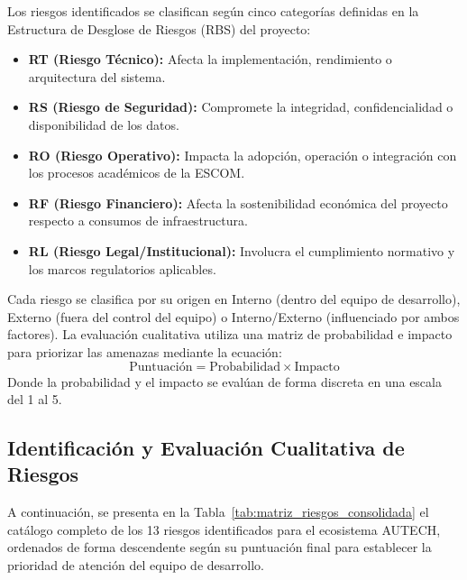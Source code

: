 Los riesgos identificados se clasifican según cinco categorías definidas en la Estructura de Desglose de Riesgos (RBS) del proyecto:
\begin{itemize}
    \item \textbf{RT (Riesgo Técnico):} Afecta la implementación, rendimiento o arquitectura del sistema.
    \item \textbf{RS (Riesgo de Seguridad):} Compromete la integridad, confidencialidad o disponibilidad de los datos.
    \item \textbf{RO (Riesgo Operativo):} Impacta la adopción, operación o integración con los procesos académicos de la ESCOM.
    \item \textbf{RF (Riesgo Financiero):} Afecta la sostenibilidad económica del proyecto respecto a consumos de infraestructura.
    \item \textbf{RL (Riesgo Legal/Institucional):} Involucra el cumplimiento normativo y los marcos regulatorios aplicables.
\end{itemize}

Cada riesgo se clasifica por su origen en Interno (dentro del equipo de desarrollo), Externo (fuera del control del equipo) o Interno/Externo (influenciado por ambos factores). La evaluación cualitativa utiliza una matriz de probabilidad e impacto para priorizar las amenazas mediante la ecuación:
\begin{equation}
    \text{Puntuación} = \text{Probabilidad} \times \text{Impacto}
\end{equation}
Donde la probabilidad y el impacto se evalúan de forma discreta en una escala del 1 al 5.

\subsection{Identificación y Evaluación Cualitativa de Riesgos}
\label{subsec:identificacion_riesgos}

A continuación, se presenta en la Tabla~\ref{tab:matriz_riesgos_consolidada} el catálogo completo de los 13 riesgos identificados para el ecosistema AUTECH, ordenados de forma descendente según su puntuación final para establecer la prioridad de atención del equipo de desarrollo.


